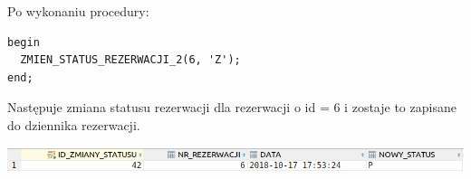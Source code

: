 Po wykonaniu procedury:
\begin{verbatim}
begin
  ZMIEN_STATUS_REZERWACJI_2(6, 'Z');
end;
\end{verbatim}

Następuje zmiana statusu rezerwacji dla rezerwacji o id = 6 i zostaje to zapisane do dziennika rezerwacji.

\includegraphics[width=\linewidth]{./images/zmien_status_rezerwacji_2.png}
